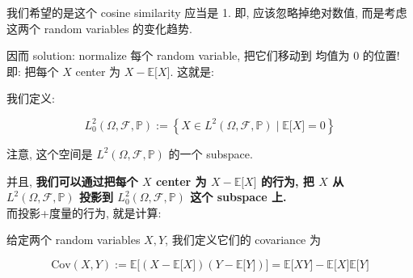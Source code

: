 我们希望的是这个 cosine similarity 应当是 1. 即, 应该忽略掉绝对数值, 而是考虑这两个 random variables 的变化趋势.

因而 solution: normalize 每个 random variable, 把它们移动到 均值为 0 的位置! 即: 把每个 \(\mathit{X}\) center 为 \(\mathit{X} - \mathbb{E}\lbrack\mathit{X}\rbrack\). 这就是:

\begin{definition}{}

我们定义:

\[\mathit{L}_{0}^{2}(\Omega,\mathcal{F},\mathbb{P}) := \left\{ {\mathit{X} \in \mathit{L}^{2}(\Omega,\mathcal{F},\mathbb{P}) \mid \mathbb{E}\lbrack\mathit{X}\rbrack = 0} \right\}\]

注意, 这个空间是 \(\mathit{L}^{2}(\Omega,\mathcal{F},\mathbb{P})\) 的一个 subspace.

\end{definition}

并且, \textbf{我们可以通过把每个 \(\mathit{X}\) center 为 \(\mathit{X} - \mathbb{E}\lbrack\mathit{X}\rbrack\) 的行为, 把 \(\mathit{X}\) 从 \(\mathit{L}^{2}(\Omega,\mathcal{F},\mathbb{P})\) 投影到 \(\mathit{L}_{0}^{2}(\Omega,\mathcal{F},\mathbb{P})\) 这个 subspace 上.}\\
而投影+度量的行为, 就是计算:

\begin{definition}{}

给定两个 random variables \(\mathit{X},\mathit{Y}\), 我们定义它们的 covariance 为

\[\text{Cov}(\mathit{X},\mathit{Y}) := \mathbb{E}\lbrack(\mathit{X} - \mathbb{E}\lbrack\mathit{X}\rbrack)(\mathit{Y} - \mathbb{E}\lbrack\mathit{Y}\rbrack)\rbrack = \mathbb{E}\lbrack\mathit{X}\mathit{Y}\rbrack - \mathbb{E}\lbrack\mathit{X}\rbrack\mathbb{E}\lbrack\mathit{Y}\rbrack\]

\end{definition}

